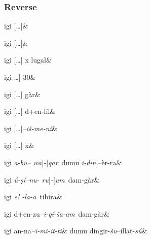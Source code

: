 \documentclass{memoir}
\begin{document}
\subsubsection{Reverse}
\begin{pairs}
  \OnehalfSpacing
  \begin{Leftside}
    \resumenumbering
    \begin{astanza}
      igi [\dots]\&
    \end{astanza}
    \begin{astanza}
      igi [\dots]\&
    \end{astanza}
    \begin{astanza}
      igi [\dots] x lugal\&
    \end{astanza}
    \begin{astanza}
    igi \dots ] 30\&
  \end{astanza}
  \begin{astanza}
    igi [\dots] gàr\&
  \end{astanza}
  \begin{astanza}
    igi [\dots] d+en-líl\&
  \end{astanza}
  \begin{astanza}
    igi [\dots]\emph{--iš-me-ni}\&
  \end{astanza}
  \begin{astanza}
    igi [\dots]\emph{--}{\sffamily [}\emph{i-ri-ba-am}\&
    \end{astanza}
    \begin{astanza}
      igi [\dots] x\&
    \end{astanza}
    \begin{astanza}
    igi \emph{a-bu-- wa}{\sffamily ]}\emph{-}{\sffamily [}\emph{qar}\ dumu \emph{i-din}{\sffamily ]}--èr-ra\&
  \end{astanza}
  \begin{astanza}
  igi \emph{ú-ṣí--nu- ru}{\sffamily ]}\emph{-}{\sffamily [}\emph{um}\  dam-gàr\&
  \end{astanza}
  \begin{astanza}
    igi \emph{e! -la-a}\ tibira\&
  \end{astanza}
  \begin{astanza}
    igi d+en-zu\emph{--i-qí-ša-am}\ dam-gàr\&
  \end{astanza}
  \begin{astanza}
    igi an-na\emph{--i-mi-it-ti}&
    \quad dumu dingir-\emph{šu}--illat-\emph{sú}\&
  \end{astanza}

\end{Leftside}
\end{pairs}
\end{document}

